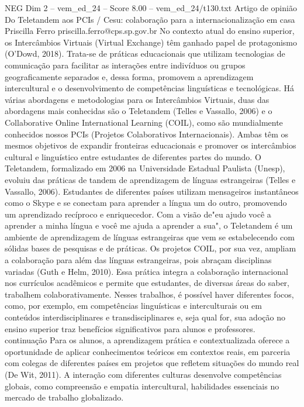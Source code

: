 \begin{textsample}{NEG Dim 2 – vem\_ed\_24 – Score 8.00 – vem\_ed\_24/t130.txt}  \label{ex:f2_neg_151}
Artigo de opinião Do Teletandem aos PCIs / Cesu: colaboração para a internacionalização em casa Priscilla Ferro priscilla.ferro@cps.sp.gov.br No contexto atual do ensino superior, os Intercâmbios Virtuais (Virtual Exchange) têm ganhado papel de protagonismo (O'Dowd, 2018).
Trata-se de práticas educacionais que utilizam tecnologias de comunicação para facilitar as interações entre indivíduos ou grupos geograficamente separados e, dessa forma, promovem a aprendizagem intercultural e o desenvolvimento de competências linguísticas e tecnológicas.
Há várias abordagens e metodologias para os Intercâmbios Virtuais, duas das abordagens mais conhecidas são o Teletandem (Telles e Vassallo, 2006) e o Collaborative Online International Learning (COIL), como são mundialmente conhecidos nossos PCIs (Projetos Colaborativos Internacionais).
Ambas têm os mesmos objetivos de expandir fronteiras educacionais e promover os intercâmbios cultural e linguístico entre estudantes de diferentes partes do mundo.
O Teletandem, formalizado em 2006 na Universidade Estadual Paulista (Unesp), evoluiu das práticas de tandem de aprendizagem de línguas estrangeiras (Telles e Vassallo, 2006).
Estudantes de diferentes países utilizam mensageiros instantâneos como o Skype e se conectam para aprender a língua um do outro, promovendo um aprendizado recíproco e enriquecedor.
Com a visão de"eu ajudo você a aprender a minha língua e você me ajuda a aprender a sua", o Teletandem é um ambiente de aprendizagem de línguas estrangeiras que vem se estabelecendo com sólidas bases de pesquisas e de práticas.
Os projetos COIL, por sua vez, ampliam a colaboração para além das línguas estrangeiras, pois abraçam disciplinas variadas (Guth e Helm, 2010).
Essa prática integra a colaboração internacional nos currículos acadêmicos e permite que estudantes, de diversas áreas do saber, trabalhem colaborativamente.
Nesses trabalhos, é possível haver diferentes focos, como, por exemplo, em competências linguísticas e interculturais ou em conteúdos interdisciplinares e transdisciplinares e, seja qual for, sua adoção no ensino superior traz benefícios significativos para alunos e professores. continuação Para os alunos, a aprendizagem prática e contextualizada oferece a oportunidade de aplicar conhecimentos teóricos em contextos reais, em parceria com colegas de diferentes países em projetos que refletem situações do mundo real (De Wit, 2011).
A interação com diferentes culturas desenvolve competências globais, como compreensão e empatia intercultural, habilidades essenciais no mercado de trabalho globalizado.

\end{textsample}
